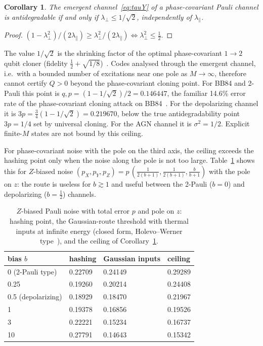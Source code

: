 \documentclass[aps,pra,reprint,superscriptaddress,nofootinbib,longbibliography,floatfix]{revtex4-2}
\newtheorem{corollary}{Corollary}
\theoremstyle{remark}
\newcommand{\lperp}{\lambda_\perp}
\newcommand{\lpar}{\lambda_\parallel}
\begin{document}
\begin{corollary}
\label{cor:ceiling}
The emergent channel~\eqref{eq:tauY} of a phase-covariant Pauli channel is antidegradable if and only if
$\lperp\le1/\sqrt2$, independently of $\lpar$.
\end{corollary}
\begin{proof}
$(1-\lperp^2)/(2\lpar)\ge\lperp^2/(2\lpar)\iff\lperp^2\le\frac12$.
\end{proof}

The value $1/\sqrt2$ is the shrinking factor of the optimal phase-covariant $1\to2$ qubit cloner
(fidelity $\frac12+\sqrt{1/8}$)~\cite{bruss2000phasecovariant}. Codes analysed through the emergent
channel, i.e.\ with a bounded number of excitations near one pole as $M\to\infty$, therefore cannot
certify $Q>0$ beyond the phase-covariant cloning point. For BB84 and 2-Pauli this point is
$q,p=(1-1/\sqrt2)/2=0.146447$, the familiar 14.6\% error rate of the phase-covariant cloning attack on
BB84~\cite{bruss2000phasecovariant}. For the depolarizing channel it is
$3p=\frac34(1-1/\sqrt2)=0.219670$, below the true antidegradability point $3p=1/4$ set by universal
cloning. For the AGN channel it is $\sigma^2=1/2$. Explicit finite-$M$ states are not bound by this
ceiling.

For phase-covariant noise with the pole on the third axis, the ceiling exceeds the hashing point only
when the noise along the pole is not too large. Table~\ref{tab:bias} shows this for $Z$-biased noise
$(p_X,p_Y,p_Z)=p\,(\frac1{2(b+1)},\frac1{2(b+1)},\frac{b}{b+1})$ with the pole on $z$: the route is
useless for $b\gtrsim1$ and useful between the 2-Pauli ($b=0$) and depolarizing ($b=\frac12$) channels.

\begin{table}[t]
\caption{$Z$-biased Pauli noise with total error $p$ and pole on $z$: hashing point, the Gaussian-route
threshold with thermal inputs at infinite energy (closed form, Holevo--Werner
type~\cite{holevo2001evaluating}), and the ceiling of Corollary~\ref{cor:ceiling}.}
\label{tab:bias}
\begin{ruledtabular}
\begin{tabular}{llll}
bias $b$ & hashing & Gaussian inputs & ceiling\\
\hline
0 (2-Pauli type) & 0.22709 & 0.24149 & 0.29289\\
0.25 & 0.19260 & 0.20214 & 0.24408\\
0.5 (depolarizing) & 0.18929 & 0.18470 & 0.21967\\
1 & 0.19378 & 0.16856 & 0.19526\\
3 & 0.22221 & 0.15234 & 0.16737\\
10 & 0.27791 & 0.14643 & 0.15342\\
\end{tabular}
\end{ruledtabular}
\end{table}
\end{document}
